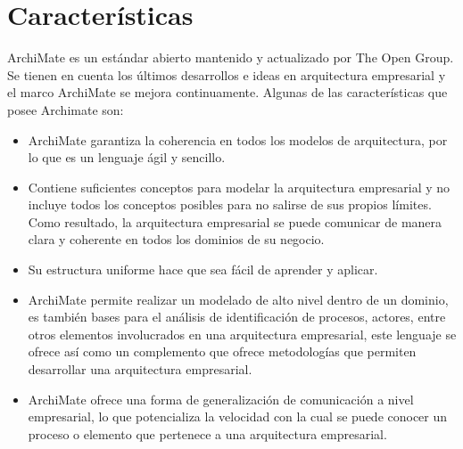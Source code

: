 {	\section{Características}	
	ArchiMate es un  estándar abierto  mantenido y actualizado por The Open Group. Se tienen en cuenta los últimos desarrollos e ideas en arquitectura empresarial y el marco ArchiMate se mejora continuamente. Algunas de las características que posee Archimate son:
    \begin{itemize}
        \item ArchiMate garantiza la coherencia en todos los modelos de arquitectura, por lo que es un lenguaje ágil y sencillo. 
        \item Contiene suficientes conceptos para modelar la arquitectura empresarial y no incluye todos los conceptos posibles para no salirse de sus propios límites. Como resultado, la arquitectura empresarial se puede comunicar de manera clara y coherente en todos los dominios de su negocio. 
        \item Su estructura uniforme hace que sea fácil de aprender y aplicar.
        \item ArchiMate permite realizar un modelado de alto nivel dentro de un dominio, es también bases para el análisis de identificación de procesos, actores, entre otros elementos involucrados en una arquitectura empresarial, este lenguaje se ofrece así como un complemento que ofrece metodologías que permiten desarrollar una arquitectura empresarial.
        \item ArchiMate ofrece una forma de generalización de comunicación a nivel empresarial, lo que potencializa la velocidad con la cual se puede conocer un proceso o elemento que pertenece a una arquitectura empresarial.
    \end{itemize}
}